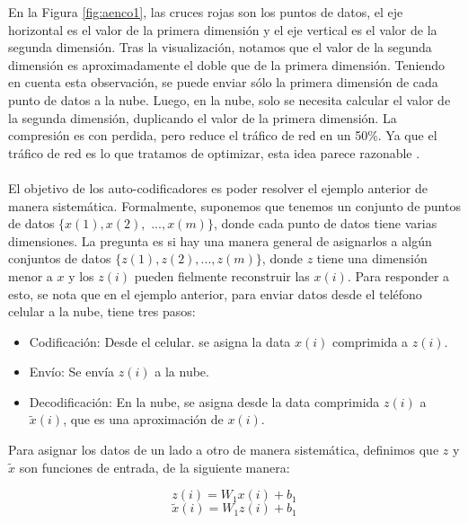     En la Figura \ref{fig:aenco1}, las cruces rojas son los puntos de datos, el eje horizontal es el valor de la primera dimensión y el eje vertical es el valor de la segunda dimensión. Tras la visualización, notamos que el valor de la segunda dimensión es aproximadamente el doble que de la primera dimensión. Teniendo en cuenta esta observación, se puede enviar sólo la primera dimensión de cada punto de datos a la nube. Luego, en la nube, solo se necesita calcular el valor de la segunda dimensión, duplicando el valor de la primera dimensión. La compresión es con perdida, pero reduce el tráfico de red en un 50\%. Ya que el tráfico de red es lo que tratamos de optimizar, esta idea parece razonable \cite{Le15atutorial}.
    \\\\
    El objetivo de los auto-codificadores es poder resolver el ejemplo anterior de manera sistemática. Formalmente, suponemos que tenemos un conjunto de puntos de datos $\{x(1), x(2),$ $..., x(m)\}$, donde cada punto de datos tiene varias dimensiones. La pregunta es si hay una manera general de asignarlos a algún conjuntos de datos $\{z(1), z(2), ..., z(m)\}$, donde $z$ tiene una dimensión menor a $x$ y los $z(i)$ pueden fielmente reconstruir las $x(i)$. Para responder a esto, se nota que en el ejemplo anterior, para enviar datos desde el teléfono celular a la nube, tiene tres pasos:

    \begin{itemize}
        \item Codificación: Desde el celular. se asigna la data $x(i)$ comprimida a $z(i)$.
        \item Envío: Se envía $z(i)$ a la nube.
        \item Decodificación: En la nube, se asigna desde la data comprimida $z(i)$ a $\tilde{x}(i)$, que es una aproximación de $x(i)$.
    \end{itemize}

    Para asignar los datos de un lado a otro de manera sistemática, definimos que $z$ y $\tilde{x}$ son funciones de entrada, de la siguiente manera:

    \begin{equation}
        z{(i)} =W_1x{(i)} + b_1
    \end{equation}
    \begin{equation}
        \tilde{x}{(i)} =W_1z{(i)} + b_1
    \end{equation}

